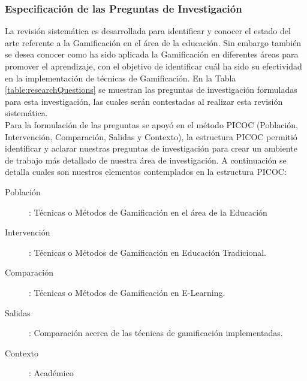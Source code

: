 \documentclass{report}
\begin{document}
    	    \subsubsection{Especificación de las Preguntas de Investigación}
            La revisión sistemática es desarrollada para identificar y conocer el estado del arte referente a la Gamificación en el área de la educación. Sin embargo también se desea conocer como ha sido aplicada la Gamificación en diferentes áreas para promover el aprendizaje, con el objetivo de identificar cuál ha sido su efectividad en la implementación de técnicas de Gamificación. En la Tabla \ref{table:researchQuestions} se muestran las preguntas de investigación formuladas para esta investigación, las cuales serán contestadas al realizar esta revisión sistemática.\\
            Para la formulación de las preguntas se apoyó en el método PICOC (Población, Intervención, Comparación, Salidas y Contexto), la estructura PICOC permitió identificar y aclarar nuestras preguntas de investigación para crear un ambiente de trabajo más detallado de nuestra área de investigación. A continuación se detalla cuales son nuestros elementos contemplados en la estructura PICOC:\\
            \begin{description}
                \item[Población]: Técnicas o Métodos de Gamificación en el área de la Educación
                \item[Intervención]: Técnicas o Métodos de Gamificación en Educación Tradicional.
                \item[Comparación]: Técnicas o Métodos de Gamificación en E-Learning.
                \item[Salidas]: Comparación acerca de las técnicas de gamificación implementadas.
                \item[Contexto]: Académico
            \end{description}
\end{document}
